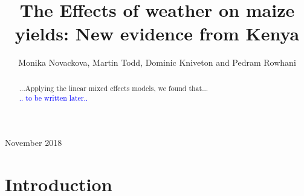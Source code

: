\documentclass[12pt]{iopart}
\begin{document}
\submitto{\ERL}

\title{The Effects of weather on maize yields: New evidence from Kenya}

\author{Monika Novackova, Martin Todd, Dominic Kniveton and Pedram Rowhani}

\address{Department of Geography, University of Sussex, Falmer, UK}
\vspace{10pt}
\begin{indented}
\item[]November 2018
\end{indented}

\doublespacing
\begin{abstract}
...Applying the linear mixed effects models, we found that...\\
\textcolor{blue}{.. to be written later..}
\end{abstract}

%
%
%
% 
%
\maketitle
\section{Introduction}\label{Introduction}
\end{document}
